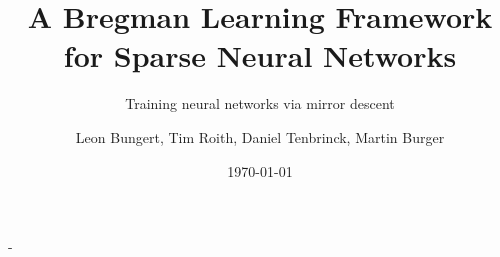 \documentclass[final, 12pt]{beamer}
\title[]{A Bregman Learning Framework for
Sparse Neural Networks}
\subtitle{Training neural networks via mirror descent}
\author[T. Roith]{Leon Bungert, Tim Roith, Daniel Tenbrinck, Martin Burger}
\institute[FAU]{Friedrich-Alexander Universität Erlangen-Nürnberg, Department Mathematik}
\date{\today}
\begin{document}
\begin{frame}{-}{}
%

%

%

%
\end{frame}
\end{document}

